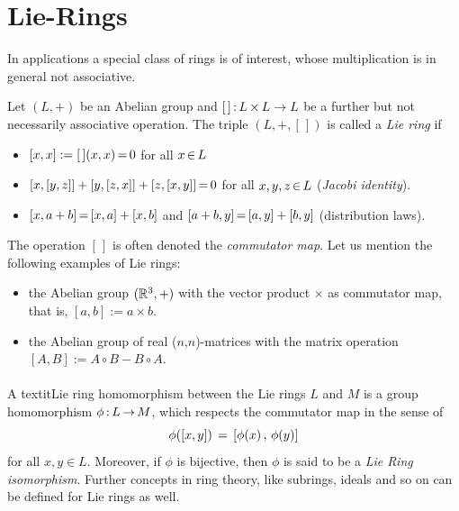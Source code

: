 \documentclass[11pt,twoside]{article}
\begin{document}
\section{Lie-Rings}
In applications a special class of rings is of interest,
whose 
multiplication is in general not associative.

\begin{definition}
Let $(L,+)$ be an Abelian group and $[\,] \: L \xtimes L \to L$
be a further but not necessarily associative operation.
The triple $(L,+,[\,])$ is called a \textit{Lie ring} if

\begin{itemize}[leftmargin=35pt]
\item[(L-1)]
$[x,x] := [\,](x,x) \eq 0$ for all $x \xeof L$
\item[(L-2)]
$[x,[y,z]] + [y,[z,x]] + [z,[x,y]] \eq 0$ for all $x,y,z \xeof L$
(\textit{Jacobi identity}).
\item[(L-3)]
$[x,a+b] \eq [x,a] + [x,b]$ and $[a+b,y] \eq [a,y] + [b,y]$ (distribution laws).
\end{itemize}
\end{definition}

The operation $[\,]$ is often denoted the \textit{commutator map}.
Let us mention the following examples of Lie rings:

\begin{itemize}[leftmargin=15pt]
\item[1.]
the Abelian group $(\R^3,+)$ with the vector product $\times$ 
as commutator map,
that is,
$[a,b] := a \times b$.

\item[2.]
the Abelian group of real ($n$,$n$)-matrices with the matrix operation
$[A,B] := A \circ B - B \circ A$.
\end{itemize}

\paragraph{}
A textit{Lie ring homomorphism} between the Lie rings $L$ and $M$ is
a group homomorphism $\phi \: L \xto M$, 
which respects the commutator map in the sense of
\[
\phi([x,y]) \= [ \phi(x) \, ,  \, \phi(y) ]
\]
for all $x,y \in L$.
Moreover,
if $\phi$ is bijective,
then $\phi$ is said to be a \textit{Lie Ring isomorphism}.
Further concepts in ring theory,
like subrings, ideals and so on can be defined for Lie rings as well.
\end{document}
